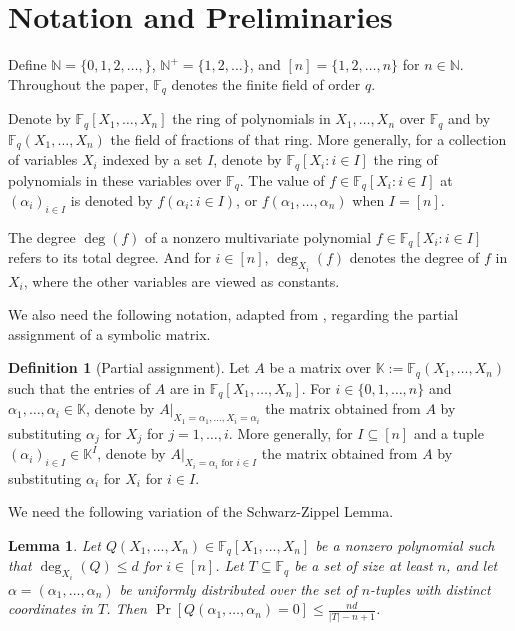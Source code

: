 \documentclass[11pt]{article}
\theoremstyle{plain}
\newtheorem{lemma}[thm]{Lemma}
\theoremstyle{definition}
\newtheorem{defn}[thm]{Definition}
\theoremstyle{remark}
\newcommand{\N}{\mathbb{N}}
\newcommand{\F}{\mathbb{F}}
\newcommand{\Fq}{\mathbb{F}_q}
\begin{document}
\section{Notation and Preliminaries}
Define $\N=\{0,1,2,\dots,\}$, $\N^+=\{1,2,\dots\}$, and $[n]=\{1,2,\ldots, n\}$ for $n\in\N$. Throughout the paper, $\Fq$ denotes the finite field of order $q$.

Denote by $\Fq[X_1, \ldots, X_n]$ the ring of polynomials in $X_1,\dots,X_n$ over $\Fq$ 
and by $\Fq(X_1, \ldots, X_n)$ the field of fractions of that ring.
More generally, for a collection of variables $X_i$ indexed by a set $I$, denote by $\Fq[X_i: i\in I]$ the ring of polynomials in these variables over $\Fq$.
The value of $f\in \Fq[X_i: i\in I]$ at $(\alpha_i)_{i\in I}$ is denoted by $f(\alpha_i: i\in I)$, or $f(\alpha_1,\dots,\alpha_n)$ when $I=[n]$.

The degree $\deg(f)$ of a nonzero multivariate polynomial $f\in \Fq[X_i: i\in I]$ refers to its total degree. And for $i\in [n]$, $\deg_{X_i}(f)$ denotes the degree of $f$ in $X_i$, where the other variables are viewed as constants. 

We also need the following notation, adapted from \cite{GZ23}, regarding the partial assignment of a symbolic matrix.

\begin{defn}[Partial assignment]
Let $A$ be a matrix over $\mathbb{K}:=\F_q(X_1,\dots,X_n)$ such that the entries of $A$ are in $\F_q[X_1,\dots,X_n]$.
For $i\in\{0,1,\dots,n\}$ and $\alpha_1,\dots,\alpha_i\in \mathbb{K}$, denote by $A|_{X_{1}=\alpha_{1},\dots,X_{i}=\alpha_{i}}$ the matrix obtained from $A$ by substituting $\alpha_{j}$ for $X_{j}$ for $j=1,\dots,i$. 
More generally, for $I\subseteq [n]$ and a tuple $(\alpha_i)_{i\in I}\in\mathbb{K}^I$, denote by $A|_{X_{i}=\alpha_{i} \text{ for } i\in I}$ the matrix obtained from $A$ by substituting $\alpha_{i}$ for $X_{i}$ for $i\in I$. 
\end{defn}


We need the following variation of the Schwarz-Zippel Lemma.

\begin{lemma}\label{lem:zero-prob}
Let $Q(X_1,\dots,X_n)\in\Fq[X_1,\dots,X_n]$ be a nonzero polynomial such that $\deg_{X_i}(Q)\leq d$ for $i\in [n]$.
Let $T\subseteq\Fq$ be a set of size at least $n$, and let $\alpha=(\alpha_1,\dots,\alpha_n)$ be uniformly distributed over the set of $n$-tuples with distinct coordinates in $T$.
Then $\Pr[Q(\alpha_1,\dots,\alpha_n)=0]\leq \frac{nd}{|T|-n+1}$.
\end{lemma}
\end{document}
